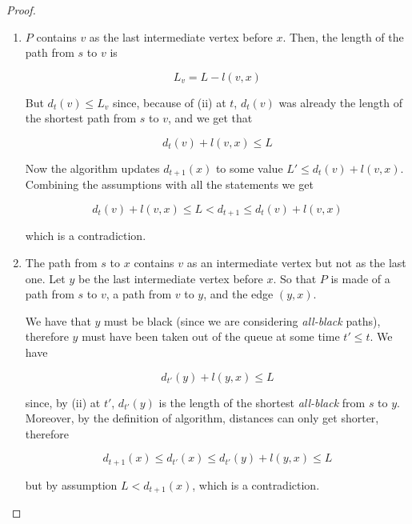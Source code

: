\documentclass[12pt]{extarticle}
\begin{document}
\begin{proof}
\begin{description}
\begin{enumerate}[label=\alph*.]
                \item
                      $P$ contains $v$ as the last intermediate vertex before $x$.
                      Then, the length of the path from $s$ to $v$ is

                      $$
                          L_v = L - l(v, x)
                      $$

                      But $d_t(v) \leq L_v$ since, because of (ii) at $t$, $d_t(v)$ was already the length of the shortest path from $s$ to $v$, and we get that

                      $$
                          d_t(v) + l(v,x) \leq L
                      $$

                      Now the algorithm updates $d_{t+1}(x)$ to some value $L' \leq d_t(v) + l(v, x)$.
                      Combining the assumptions with all the statements we get

                      $$
                          d_t(v) + l(v, x) \leq L < d_{t+1} \leq d_t(v) + l(v, x)
                      $$

                      which is a contradiction.

                \item
                      The path from $s$ to $x$ contains $v$ as an intermediate vertex but not as the last one.
                      Let $y$ be the last intermediate vertex before $x$.
                      So that $P$ is made of a path from $s$ to $v$, a path from $v$ to $y$, and the edge $(y, x)$.

                      We have that $y$ must be black (since we are considering \textit{all-black} paths), therefore $y$ must have been taken out of the queue at some time $t' \leq t$. We have

                      $$
                          d_{t'}(y) + l(y, x) \leq L
                      $$

                      since, by (ii) at $t'$, $d_{t'}(y)$ is the length of the shortest \textit{all-black} from $s$ to $y$.
                      Moreover, by the definition of algorithm, distances can only get shorter, therefore

                      $$
                          d_{t+1}(x) \leq d_{t'}(x) \leq d_{t'}(y) + l(y, x) \leq L
                      $$

                      but by assumption $L < d_{t+1}(x)$, which is a contradiction.
            \end{enumerate}
    \end{description}
\end{proof}
\end{document}
